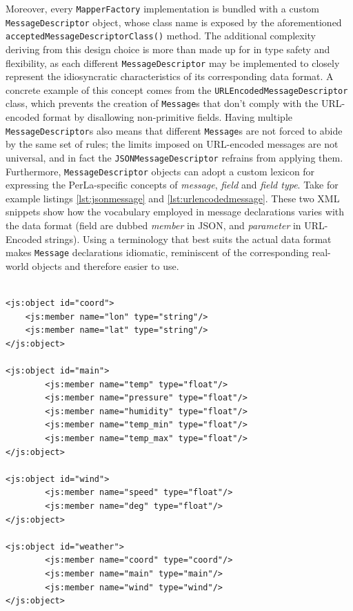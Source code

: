 Moreover, every \texttt{MapperFactory} implementation is bundled with a custom
\texttt{MessageDescriptor} object, whose class name is exposed by the
aforementioned \texttt{acceptedMessageDescriptorClass()} method. The additional
complexity deriving from this design choice is more than made up for in type
safety and flexibility, as each different \texttt{MessageDescriptor} may be
implemented to closely represent the idiosyncratic characteristics of its
corresponding data format. A concrete example of this concept comes from the
\texttt{URLEncodedMessageDescriptor} class, which prevents the creation of
\texttt{Message}s that don't comply with the URL-encoded format by disallowing
non-primitive fields. Having multiple \texttt{MessageDescriptor}s also means
that different \texttt{Message}s are not forced to abide by the same set of
rules; the limits imposed on URL-encoded messages are not universal, and in
fact the \texttt{JSONMessageDescriptor} refrains from applying them.
Furthermore, \texttt{MessageDescriptor} objects can adopt a custom lexicon for
expressing the PerLa-specific concepts of \textit{message}, \textit{field} and
\textit{field type}. Take for example listings \ref{lst:jsonmessage} and
\ref{lst:urlencodedmessage}. These two XML snippets show how the vocabulary
employed in message declarations varies with the data format (field are dubbed
\textit{member} in JSON, and \textit{parameter} in URL-Encoded strings). Using
a terminology that best suits the actual data format makes \texttt{Message}
declarations idiomatic, reminiscent of the corresponding real-world objects and
therefore easier to use.

\lstset{language=XML}
\begin{lstlisting}[float,floatplacement=!hbt,caption={A compound JSON message
        declared using the JSONMessageDescriptor (XML notation). Note that the
        data type of all fields inside \texttt{weather} message is a reference
        to a previously declared \texttt{Message}.
},label={lst:jsonmessage}]

<js:object id="coord">
    <js:member name="lon" type="string"/>
    <js:member name="lat" type="string"/>
</js:object>

<js:object id="main">
        <js:member name="temp" type="float"/>
        <js:member name="pressure" type="float"/>
        <js:member name="humidity" type="float"/>
        <js:member name="temp_min" type="float"/>
        <js:member name="temp_max" type="float"/>
</js:object>

<js:object id="wind">
        <js:member name="speed" type="float"/>
        <js:member name="deg" type="float"/>
</js:object>

<js:object id="weather">
        <js:member name="coord" type="coord"/>
        <js:member name="main" type="main"/>
        <js:member name="wind" type="wind"/>
</js:object>

\end{lstlisting}



